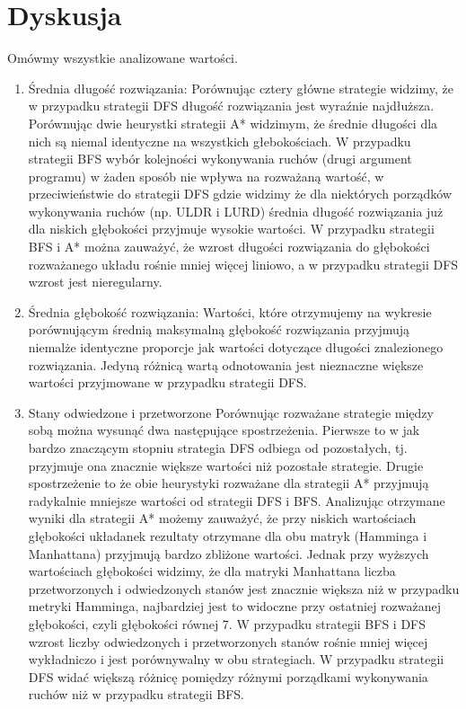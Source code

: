 \documentclass{classrep}
\begin{document}
\section{Dyskusja}
{Omówmy wszystkie analizowane wartości.
\begin{enumerate}
\item{ Średnia długość rozwiązania:}
\newline Porównując cztery główne strategie widzimy, że w przypadku strategii DFS długość rozwiązania jest wyraźnie najdłuższa. Porównując dwie heurystki strategii A* widzimym, że średnie długości dla nich są niemal identyczne na wszystkich głebokościach. W przypadku strategii BFS wybór kolejności wykonywania ruchów (drugi argument programu) w żaden sposób nie wpływa na rozważaną wartość, w przeciwieństwie do strategii DFS gdzie widzimy że dla niektórych porządków wykonywania ruchów (np. ULDR i LURD) średnia długość rozwiązania już dla niskich głębokości przyjmuje wysokie wartości. W przypadku strategii BFS i A* można zauważyć, że wzrost długości rozwiązania do głębokości rozważanego układu rośnie mniej więcej liniowo, a w przypadku strategii DFS wzrost jest nieregularny.
\item {Średnia głębokość rozwiązania:}
\newline Wartości, które otrzymujemy na wykresie porównującym średnią maksymalną głębokość rozwiązania przyjmują niemalże identyczne proporcje jak wartości dotyczące długości znalezionego rozwiązania. Jedyną różnicą wartą odnotowania jest nieznaczne większe wartości przyjmowane w przypadku strategii DFS.
\item {Stany odwiedzone i przetworzone}
\newline Porównując rozważane strategie między sobą można wysunąć dwa następujące spostrzeżenia. Pierwsze to w jak bardzo znaczącym stopniu strategia DFS odbiega od pozostałych, tj. przyjmuje ona znacznie większe wartości niż pozostałe strategie. Drugie spostrzeżenie to że obie heurystyki rozważane dla strategii A* przyjmują radykalnie mniejsze wartości od strategii DFS i BFS. Analizując otrzymane wyniki dla strategii A* możemy zauważyć, że przy niskich wartościach głębokości układanek rezultaty otrzymane dla obu matryk (Hamminga i Manhattana) przyjmują bardzo zbliżone wartości. Jednak przy wyższych wartościach głębokości widzimy, że dla matryki Manhattana liczba przetworzonych i odwiedzonych stanów jest znacznie większa niż w przypadku metryki Hamminga, najbardziej jest to widoczne przy ostatniej rozważanej głębokości, czyli głębokości równej 7. W przypadku strategii BFS i DFS wzrost liczby odwiedzonych i przetworzonych stanów rośnie mniej więcej wykładniczo i jest porównywalny w obu strategiach. W przypadku strategii DFS widać większą różnicę pomiędzy różnymi porządkami wykonywania ruchów niż w przypadku strategii BFS.
\end{enumerate}
}
\end{document}
